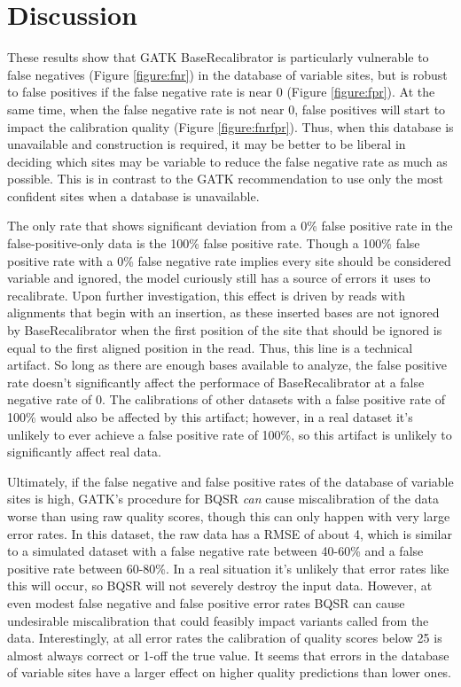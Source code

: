 \section{Discussion}
\label{sec:kbbq_discussion}
These results show that GATK BaseRecalibrator is particularly vulnerable to false negatives (Figure \ref{figure:fnr}) in the database of variable sites, but is robust to false positives if the false negative rate is near 0 (Figure \ref{figure:fpr}). At the same time, when the false negative rate is not near 0, false positives will start to impact the calibration quality (Figure \ref{figure:fnrfpr}). Thus, when this database is unavailable and construction is required, it may be better to be liberal in deciding which sites may be variable to reduce the false negative rate as much as possible. This is in contrast to the GATK recommendation to use only the most confident sites when a database is unavailable.

The only rate that shows significant deviation from a 0\% false positive rate in the false-positive-only data is the 100\% false positive rate. Though a 100\% false positive rate with a 0\% false negative rate implies every site should be considered variable and ignored, the model curiously still has a source of errors it uses to recalibrate. Upon further investigation, this effect is driven by reads with alignments that begin with an insertion, as these inserted bases are not ignored by BaseRecalibrator when the first position of the site that should be ignored is equal to the first aligned position in the read. Thus, this line is a technical artifact. So long as there are enough bases available to analyze, the false positive rate doesn't significantly affect the performace of BaseRecalibrator at a false negative rate of 0. The calibrations of other datasets with a false positive rate of 100\% would also be affected by this artifact; however, in a real dataset it's unlikely to ever achieve a false positive rate of 100\%, so this artifact is unlikely to significantly affect real data.

Ultimately, if the false negative and false positive rates of the database of variable sites is high, GATK's procedure for BQSR \textit{can} cause miscalibration of the data worse than using raw quality scores, though this can only happen with very large error rates. In this dataset, the raw data has a RMSE of about 4, which is similar to a simulated dataset with a false negative rate between 40-60\% and a false positive rate between 60-80\%. In a real situation it's unlikely that error rates like this will occur, so BQSR will not severely destroy the input data. However, at even modest false negative and false positive error rates BQSR can cause undesirable miscalibration that could feasibly impact variants called from the data. Interestingly, at all error rates the calibration of quality scores below 25 is almost always correct or 1-off the true value. It seems that errors in the database of variable sites have a larger effect on higher quality predictions than lower ones.

